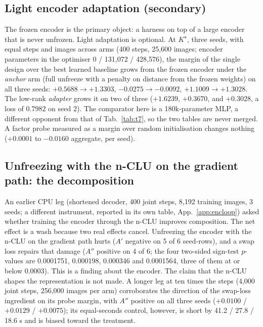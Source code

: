 \documentclass{article} %
\newcommand{\Kstar}{\ensuremath{K^{\star}}}
\begin{document}
\subsection*{Light encoder adaptation (secondary)}

The frozen encoder is the primary object: a harness on top of a large encoder that is never
unfrozen. Light adaptation is optional. At $\Kstar$, three
seeds, with equal steps and images across arms (400 steps, 25,600 images; encoder parameters in the
optimiser 0 / 131,072 / 428,576), the margin of the single design over the best learned
baseline grows from the frozen encoder under the \emph{anchor} arm (full unfreeze with a
penalty on distance from the frozen weights) on all three seeds: $+0.5688\to+1.3303$,
$-0.0275\to-0.0092$, $+1.1009\to+1.3028$. The low-rank \emph{adapter} grows it on two of
three ($+1.6239$, $+0.3670$, and $+0.3028$, a loss of $0.7982$ on seed 2).
The comparator here is a 180k-parameter MLP, a different opponent from that of
Tab.~\ref{tab:t7}, so the two tables are never merged. A factor probe measured as a margin over
random initialisation changes nothing ($+0.0001$ to $-0.0160$ aggregate, per seed).

\subsection*{Unfreezing with the n-CLU on the gradient path: the decomposition}

An earlier CPU leg (shortened decoder, 400 joint steps, 8,192 training images, 3 seeds; a
different instrument, reported in its own table, App.~\ref{app:encloop}) asked whether
training the encoder through the n-CLU improves composition. The net effect is a wash because two
real effects cancel. Unfreezing the encoder with the n-CLU on the gradient path hurts ($A'$
negative on 5 of 6 seed-rows), and a swap loss repairs that damage ($A''$ positive on 4 of 6;
the four two-sided sign-test $p$-values are 0.0001751, 0.000198, 0.000346 and 0.0001564, three
of them at or below 0.0003). This is a finding about the encoder. The claim
that the n-CLU shapes the representation is not made. %
A longer leg at ten times the steps (4,000 joint steps, 256,000 images per arm) corroborates
the direction of the swap-loss ingredient on its probe margin, with $A''$ positive on all three
seeds ($+0.0100$ / $+0.0129$ / $+0.0075$); its equal-seconds control, however, is short by 41.2 /
27.8 / 18.6 s and is biased toward the treatment. %
\end{document}
